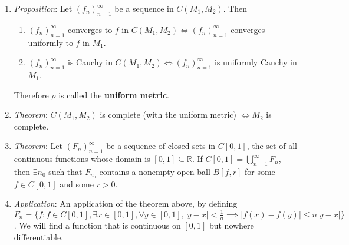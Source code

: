 \documentclass[10pt]{article}
\newcommand{\seqn}[1]{(#1)^\infty_{n=1}}
\newcommand{\real}{\mathbb{R}}
\newcommand{\cmm}{C(M_1,M_2)}
\begin{document}
\begin{multicols*}{3}
	\begin{enumerate}
		\item \emph{Proposition}: Let $\seqn{f_{n}}$ be a sequence in $\cmm$. Then
		\begin{enumerate}
			\item $\seqn{f_{n}}$ converges to $f$ in $\cmm\iff\seqn{f_{n}}$ converges
				uniformly to $f$ in $M_{1}$.
			\item $\seqn{f_{n}}$ is Cauchy in $\cmm\iff\seqn{f_{n}}$ is uniformly
				Cauchy in $M_{1}$.
		\end{enumerate}
		Therefore $\rho$ is called the \textbf{uniform metric}.
		\item \emph{Theorem}: $\cmm$ is complete (with the uniform metric)
			$\iff M_{2}$ is complete.
		\item \emph{Theorem}: Let $\seqn{F_{n}}$ be a sequence of closed sets in
			$C[0,1]$, the set of all continuous functions whose domain is
			$[0,1]\subseteq\real$. If $C[0,1]=\bigcup\limits^{\infty}_{n=1}F_{n}$,
			then $\exists n_{0}$ such that $F_{n_{0}}$ contains a nonempty open ball
			$B[f,r]$ for some $f\in C[0,1]$ and some $r>0$.
		\item \emph{Application}: An application of the theorem above, by defining
			$F_{n}=\{f:f\in C[0,1], \exists x\in[0,1],\forall y\in[0,1],|y-x|<\frac{1}{n}\implies|f(x)-f(y)|\leq n|y-x|\}$.
			We will find a function that is continuous on $[0,1]$ but nowhere
			differentiable.

	\end{enumerate}
\end{multicols*}
\end{document}
